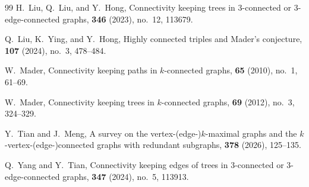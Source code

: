 \documentclass[11pt]{article}
\numberwithin{equation}{section}
\begin{document}
\begin{thebibliography}{99}
H.~Liu, Q.~Liu, and Y.~Hong,
\newblock Connectivity keeping trees in 3-connected or 3-edge-connected graphs,
 \textbf{346} (2023), no.~12, 113679.

Q.~Liu, K.~Ying, and Y.~Hong,
\newblock Highly connected triples and Mader's conjecture,
 {\bf 107} (2024), no.~3, 478--484.

W.~Mader,
\newblock Connectivity keeping paths in $k$-connected graphs,
 \textbf{65} (2010), no.~1, 61--69.

W.~Mader,
\newblock Connectivity keeping trees in $k$-connected graphs,
 \textbf{69} (2012), no.~3, 324--329.


Y.~Tian and J.~Meng,
\newblock A survey on the vertex-(edge-)$k$-maximal graphs and the $k$-vertex-(edge-)connected graphs with redundant subgraphs,
 \textbf{378} (2026), 125--135.

Q.~Yang and Y.~Tian,
\newblock Connectivity keeping edges of trees in $3$-connected or $3$-edge-connected graphs,
 \textbf{347} (2024), no.~5, 113913.

\end{thebibliography}
\end{document}
